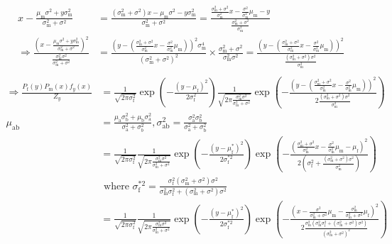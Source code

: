 \documentclass{article}\usepackage[]{graphicx}\usepackage[]{color}
\newcommand{\x}[1]{\text{#1}}
\begin{document}
\begin{landscape}
\begin{align*}
\\ x-\frac{\mu_\x{m}\sigma^2+y\sigma_\x{m}^2}{\sigma_\x{m}^2+\sigma^2}&=\frac{(\sigma_\x{m}^2+\sigma^2)x-\mu_\x{m}\sigma^2-y\sigma_\x{m}^2}{\sigma_\x{m}^2+\sigma^2}=\frac{\frac{\sigma_\x{m}^2+\sigma^2}{\sigma_\x{m}^2}x-\frac{\sigma^2}{\sigma_\x{m}^2}\mu_\x{m}-y}{\frac{\sigma_\x{m}^2+\sigma^2}{\sigma_\x{m}^2}}
\\ \Rightarrow \frac{(x-\frac{\mu_\x{m}\sigma^2+y\sigma_\x{m}^2}{\sigma_\x{m}^2+\sigma^2})^2}{\frac{\sigma_\x{m}^2\sigma^2}{\sigma_\x{m}^2+\sigma^2}}&=\frac{\left(y-\left(\frac{\sigma_\x{m}^2+\sigma^2}{\sigma_\x{m}^2}x-\frac{\sigma^2}{\sigma_\x{m}^2}\mu_\x{m}\right)\right)^2\sigma_\x{m}^4}{(\sigma_\x{m}^2+\sigma^2)^2}\times\frac{\sigma_\x{m}^2+\sigma^2}{\sigma_\x{m}^2\sigma^2}=\frac{\left(y-\left(\frac{\sigma_\x{m}^2+\sigma^2}{\sigma_\x{m}^2}x-\frac{\sigma^2}{\sigma_\x{m}^2}\mu_\x{m}\right)\right)^2}{\frac{(\sigma_\x{m}^2+\sigma^2)\sigma^2}{\sigma_\x{m}^2}}
\end{align*}
\begin{align*}
\\ \Rightarrow \frac{P_\x{f}(y)P_\x{m}(x)f_y(x)}{Z_y}&=\frac{1}{\sqrt{2\pi\sigma_\x{f}^2}}\exp\left(-\frac{(y-\mu_\x{f})^2}{2\sigma_\x{f}^2}\right)\frac{1}{\sqrt{2\pi\frac{\sigma_\x{m}^2\sigma^2}{\sigma_\x{m}^2+\sigma^2}}}\exp\left(-\frac{\left(y-\left(\frac{\sigma_\x{m}^2+\sigma^2}{\sigma_\x{m}^2}x-\frac{\sigma^2}{\sigma_\x{m}^2}\mu_\x{m}\right)\right)^2}{2\frac{(\sigma_\x{m}^2+\sigma^2)\sigma^2}{\sigma_\x{m}^2}}\right)
\\ \mu_\text{ab}&=\frac{\mu_\text{a}\sigma_\text{b}^2+\mu_\text{b}\sigma_\text{a}^2}{\sigma_\text{a}^2+\sigma_b^2}, \sigma_\text{ab}^2=\frac{\sigma_\text{a}^2\sigma_\text{b}^2}{\sigma_\text{a}^2+\sigma_\text{b}^2}
\\&=\frac{1}{\sqrt{2\pi\sigma_\x{f}^2}}\frac{1}{\sqrt{2\pi\frac{\sigma_\x{m}^2\sigma^2}{\sigma_\x{m}^2+\sigma^2}}}\exp\left(-\frac{(y-\mu_\x{f}^*)^2}{2\sigma_\x{f}^{*2}}\right)\exp\left(-\frac{\left(\frac{\sigma_\x{m}^2+\sigma^2}{\sigma_\x{m}^2}x-\frac{\sigma^2}{\sigma_\x{m}^2}\mu_\x{m}-\mu_\x{f}\right)^2}{2\left(\sigma_\x{f}^2+\frac{(\sigma_\x{m}^2+\sigma^2)\sigma^2}{\sigma_\x{m}^2}\right)}\right)
\\ & \text{ where } \sigma_\x{f}^{*2}=\frac{\sigma_\x{f}^2(\sigma_\x{m}^2+\sigma^2)\sigma^2}{\sigma_\x{m}^2\sigma_\x{f}^2+(\sigma_\x{m}^2+\sigma^2)\sigma^2}
\\&=\frac{1}{\sqrt{2\pi\sigma_\x{f}^2}}\frac{1}{\sqrt{2\pi\frac{\sigma_\x{m}^2\sigma^2}{\sigma_\x{m}^2+\sigma^2}}}\exp\left(-\frac{(y-\mu_\x{f}^*)^2}{2\sigma_\x{f}^{*2}}\right)\exp\left(-\frac{\left(x-\frac{\sigma^2}{\sigma_\x{m}^2+\sigma^2}\mu_\x{m}-\frac{\sigma_\x{m}^2}{\sigma_\x{m}^2+\sigma^2}\mu_\x{f}\right)^2}{2\frac{\sigma_\x{m}^2(\sigma_\x{m}^2\sigma_\x{f}^2+(\sigma_\x{m}^2+\sigma^2)\sigma^2)}{(\sigma_\x{m}^2+\sigma^2)^2}}\right)

\end{align*}
\end{landscape}
\end{document}
